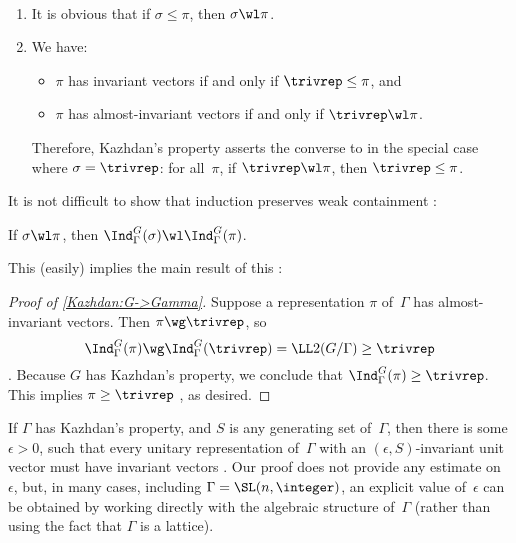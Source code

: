 \begin{rems} \label{WeakContainRem}\ 
\noprelistbreak
	\begin{enumerate}
	\item \label{WeakContainRem-weaker}
	It is obvious that if $\sigma \le \pi$, then $\sigma \wl \pi$. 
	
	\item We have:
		\begin{itemize}
		\item $\pi$ has invariant vectors if and only if $\trivrep\le \pi$,
		and
		\item $\pi$ has almost-invariant vectors if and only if $\trivrep \wl \pi$. 
		\end{itemize}
	Therefore, Kazhdan's property asserts the converse to  in the special case where $\sigma = \trivrep$: for all~$\pi$, if $\trivrep \wl \pi$, then $\trivrep \le \pi$.
	\end{enumerate}
\end{rems}

It is not difficult to show that induction preserves weak containment :

\begin{lem} \label{IndWeakCont}
If $\sigma \wl \pi$, then $\Ind_\Gamma ^G(\sigma ) \wl  \Ind_\Gamma ^G(\pi )$.
\end{lem}

This (easily) implies the main result of this :

\begin{proof}[Proof of \cref{Kazhdan:G->Gamma}]
Suppose a representation $\pi$ of~$\Gamma $ has
almost-invariant vectors.
 Then $\pi \wg \trivrep$, so 
  $$ \Ind_\Gamma ^G(\pi ) \wg \Ind_\Gamma ^G(\trivrep) =
\LL2(G/\Gamma ) \ge \trivrep $$
.
 Because $G$ has Kazhdan's property, we conclude that
$\Ind_\Gamma ^G(\pi ) \ge \trivrep$.
 This implies $\pi \ge \trivrep$ , as desired.
 \end{proof}
 
\begin{rem} \label{ExplicitKazhdanConstants}
If $\Gamma$ has Kazhdan's property, and $S$ is any generating set of~$\Gamma$, then there is some $\epsilon > 0$, such that every unitary representation of~$\Gamma$ with an $(\epsilon,S)$-invariant unit vector must have invariant vectors . Our proof does not provide any estimate on~$\epsilon$, but, in many cases, including $\Gamma = \SL(n,\integer)$, an explicit value of~$\epsilon$ can be obtained by working directly with the algebraic structure of~$\Gamma$ (rather than using the fact that $\Gamma$ is a lattice).
\end{rem}

